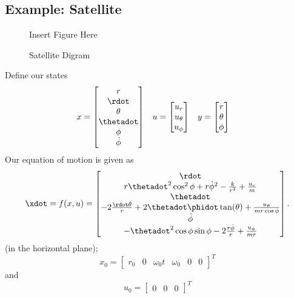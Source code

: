\documentclass[10pt]{article}
\begin{document}
\subsection{Example: Satellite}
\begin{figure}
  \centering
  {\Large Insert Figure Here}
  \caption{Satellite Digram}
\end{figure}
Define our states
\begin{align}
  x &=
  \begin{bmatrix}
    r \\ \rdot \\ \theta \\ \thetadot \\ \phi \\ \dot{\phi}
  \end{bmatrix}
  & u &=
  \begin{bmatrix}
    u_r \\ u_\theta \\ u_\phi
  \end{bmatrix}
  & y &=
  \begin{bmatrix}
    r \\ \theta \\ \phi
  \end{bmatrix}
\end{align}
Our equation of motion is given as
\begin{equation}
  \xdot = f(x,u) =
  \begin{bmatrix}
    \rdot \\
    r\thetadot^2\cos^2\phi + r \dot{\phi}^2 - \frac{k}{r^2} +
    \frac{u_r}{m}\\
    \thetadot \\
    -2\frac{\rdot\theta}{r} + 2\thetadot\phidot\tan(\theta) +
      \frac{u_\theta}{mr\cos\phi} \\
    \dot{\phi}\\
    -\thetadot^2\cos\phi \sin\phi - 2\frac{r\dot{\phi}}{r} +
    \frac{u_\phi}{mr} \\
  \end{bmatrix}.
\end{equation}
(in the horizontal plane);
\begin{equation}
  x_0 =
  \begin{bmatrix}
    r_0 & 0 & \omega_0 t & \omega_0 & 0 & 0
  \end{bmatrix}^T
\end{equation}
and 
\begin{equation}
  u_0 =
  \begin{bmatrix}
    0 & 0 & 0
  \end{bmatrix}^T
\end{equation}
\end{document}
